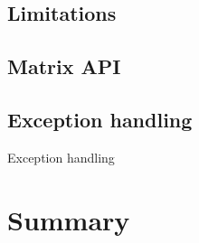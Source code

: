 






\subsection{Limitations}

\subsection{Matrix API}


\subsection{Exception handling}
Exception handling



 
 

\section{Summary}